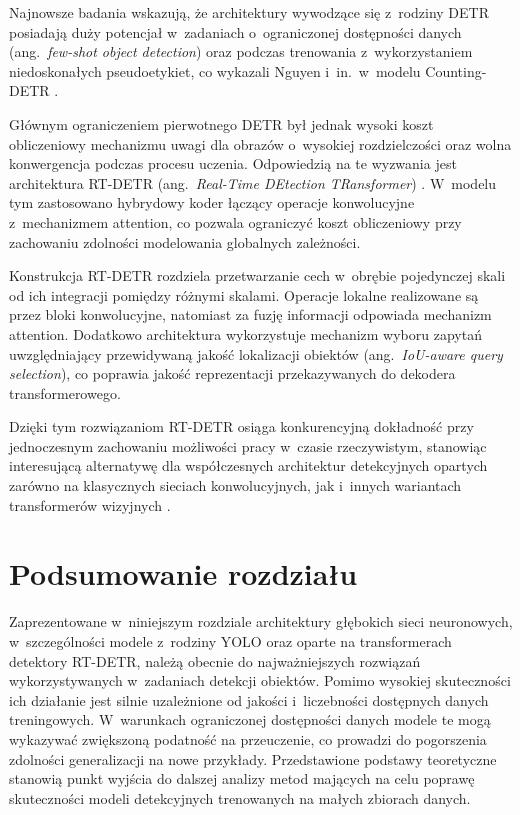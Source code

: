 Najnowsze badania wskazują, że architektury wywodzące się z~rodziny DETR posiadają duży potencjał w~zadaniach o~ograniczonej dostępności danych (ang.\ \emph{few-shot object detection}) oraz podczas trenowania z~wykorzystaniem niedoskonałych pseudoetykiet, co wykazali Nguyen i~in.\ w~modelu Counting-DETR \cite{Nguyen2022}.

Głównym ograniczeniem pierwotnego DETR był jednak wysoki koszt obliczeniowy mechanizmu uwagi dla obrazów o~wysokiej rozdzielczości oraz wolna konwergencja podczas procesu uczenia. Odpowiedzią na te wyzwania jest architektura RT-DETR (ang.\ \emph{Real-Time DEtection TRansformer}) \cite{Lv2023}. W~modelu tym zastosowano hybrydowy koder łączący operacje konwolucyjne z~mechanizmem attention, co pozwala ograniczyć koszt obliczeniowy przy zachowaniu zdolności modelowania globalnych zależności.

Konstrukcja RT-DETR rozdziela przetwarzanie cech w~obrębie pojedynczej skali od ich integracji pomiędzy różnymi skalami. Operacje lokalne realizowane są przez bloki konwolucyjne, natomiast za fuzję informacji odpowiada mechanizm attention. Dodatkowo architektura wykorzystuje mechanizm wyboru zapytań uwzględniający przewidywaną jakość lokalizacji obiektów (ang.\ \emph{IoU-aware query selection}), co poprawia jakość reprezentacji przekazywanych do dekodera transformerowego.

Dzięki tym rozwiązaniom RT-DETR osiąga konkurencyjną dokładność przy jednoczesnym zachowaniu możliwości pracy w~czasie rzeczywistym, stanowiąc interesującą alternatywę dla współczesnych architektur detekcyjnych opartych zarówno na klasycznych sieciach konwolucyjnych, jak i~innych wariantach transformerów wizyjnych \cite{Lv2023}.

\section{Podsumowanie rozdziału}

Zaprezentowane w~niniejszym rozdziale architektury głębokich sieci neuronowych, w~szczególności modele z~rodziny YOLO oraz oparte na transformerach detektory RT-DETR, należą obecnie do najważniejszych rozwiązań wykorzystywanych w~zadaniach detekcji obiektów. Pomimo wysokiej skuteczności ich działanie jest silnie uzależnione od jakości i~liczebności dostępnych danych treningowych. W~warunkach ograniczonej dostępności danych modele te mogą wykazywać zwiększoną podatność na przeuczenie, co prowadzi do pogorszenia zdolności generalizacji na nowe przykłady. Przedstawione podstawy teoretyczne stanowią punkt wyjścia do dalszej analizy metod mających na celu poprawę skuteczności modeli detekcyjnych trenowanych na małych zbiorach danych. 
